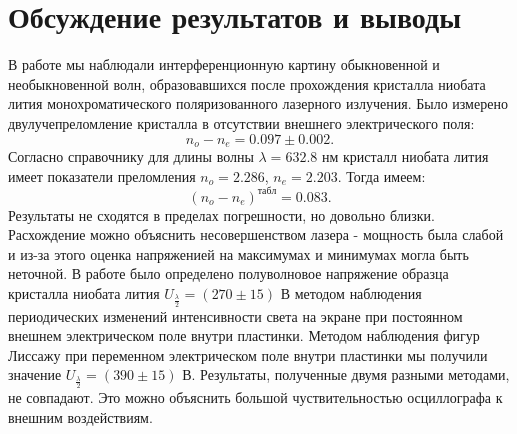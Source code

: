 \section*{Обсуждение результатов и выводы}
В работе мы наблюдали интерференционную картину обыкновенной и необыкновенной волн, образовавшихся после прохождения кристалла ниобата лития монохроматического поляризованного лазерного излучения.
\n\n
Было измерено двулучепреломление кристалла в отсутствии внешнего электрического поля: 
\[n_o - n_e = 0.097 \pm 0.002.\]
\n
Согласно справочнику для длины волны $\lambda = 632.8$ нм кристалл ниобата лития имеет показатели преломления $n_o = 2.286$, $n_e = 2.203$. Тогда имеем:
\[(n_o - n_e)^{табл} = 0.083.\]
\n
Результаты не сходятся в пределах погрешности, но довольно близки. Расхождение можно объяснить несовершенством лазера - мощность была слабой и из-за этого оценка напряженией на максимумах и минимумах могла быть неточной.
\n\n
В работе было определено полуволновое напряжение образца кристалла ниобата лития $U_{\frac{\lambda}{2}} = (270 \pm 15)$ В методом наблюдения периодических изменений интенсивности света на экране при постоянном внешнем электрическом поле внутри пластинки. 
\n\n
Методом наблюдения фигур Лиссажу при переменном электрическом поле внутри пластинки мы получили значение $U_{\frac{\lambda}{2}} = (390 \pm 15)$ В.
\n\n
Результаты, полученные двумя разными методами, не совпадают. Это можно объяснить большой чуствительностью осциллографа к внешним воздействиям.
